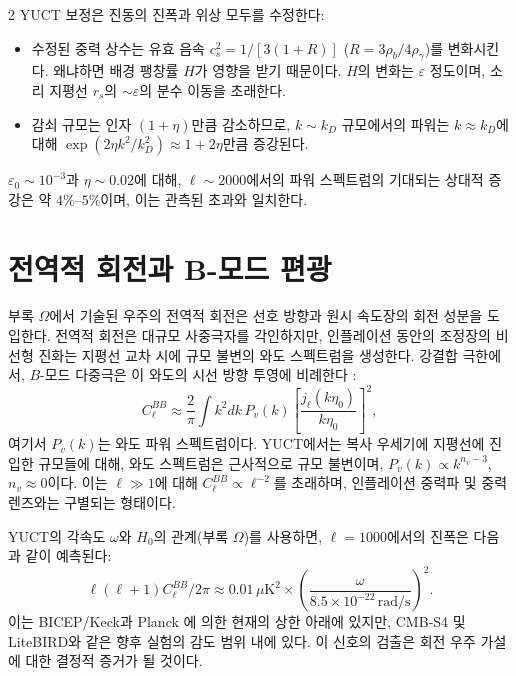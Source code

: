 \documentclass[11pt,a4paper]{article}
\begin{document}
\begin{multicols}{2}
		YUCT 보정은 진동의 진폭과 위상 모두를 수정한다:
		\begin{itemize}
			\item 수정된 중력 상수는 유효 음속 $c_s^2 = 1/[3(1+R)]$ ($R = 3\rho_b/4\rho_\gamma$)를 변화시킨다. 왜냐하면 배경 팽창률 $H$가 영향을 받기 때문이다. $H$의 변화는 $\varepsilon$ 정도이며, 소리 지평선 $r_s$의 $\sim \varepsilon$의 분수 이동을 초래한다.
			\item 감쇠 규모는 인자 $(1+\eta)$만큼 감소하므로, $k \sim k_D$ 규모에서의 파워는 $k \approx k_D$에 대해 $\exp(2\eta k^2/k_D^2) \approx 1 + 2\eta$만큼 증강된다.
		\end{itemize}
		$\varepsilon_0 \sim 10^{-3}$과 $\eta \sim 0.02$에 대해, $\ell \sim 2000$에서의 파워 스펙트럼의 기대되는 상대적 증강은 약 $4\%$--$5\%$이며, 이는 관측된 초과와 일치한다.
		
		\section{전역적 회전과 B-모드 편광}
		
		부록 $\Omega$에서 기술된 우주의 전역적 회전은 선호 방향과 원시 속도장의 회전 성분을 도입한다. 전역적 회전은 대규모 사중극자를 각인하지만, 인플레이션 동안의 조정장의 비선형 진화는 지평선 교차 시에 규모 불변의 와도 스펙트럼을 생성한다. 강결합 극한에서, $B$-모드 다중극은 이 와도의 시선 방향 투영에 비례한다 \cite{Cooray2005}:
		\begin{equation}
			C_\ell^{BB} \approx \frac{2}{\pi} \int k^2 dk \, P_v(k) \left[ \frac{j_\ell(k\eta_0)}{k\eta_0} \right]^2,
		\end{equation}
		여기서 $P_v(k)$는 와도 파워 스펙트럼이다. YUCT에서는 복사 우세기에 지평선에 진입한 규모들에 대해, 와도 스펙트럼은 근사적으로 규모 불변이며, $P_v(k) \propto k^{n_v-3}$, $n_v \approx 0$이다. 이는 $\ell \gg 1$에 대해 $C_\ell^{BB} \propto \ell^{-2}$를 초래하며, 인플레이션 중력파 및 중력 렌즈와는 구별되는 형태이다.
		
		YUCT의 각속도 $\omega$와 $H_0$의 관계(부록 $\Omega$)를 사용하면, $\ell=1000$에서의 진폭은 다음과 같이 예측된다:
		\begin{equation}
			\ell(\ell+1)C_\ell^{BB}/2\pi \approx 0.01\,\mu\text{K}^2 \times \left(\frac{\omega}{8.5\times10^{-22}\,\text{rad/s}}\right)^2.
			\label{eq:BB_amplitude}
		\end{equation}
		이는 BICEP/Keck과 Planck \cite{BICEP2021}에 의한 현재의 상한 아래에 있지만, CMB‑S4 및 LiteBIRD와 같은 향후 실험의 감도 범위 내에 있다. 이 신호의 검출은 회전 우주 가설에 대한 결정적 증거가 될 것이다.
		

\end{multicols}
\end{document}
